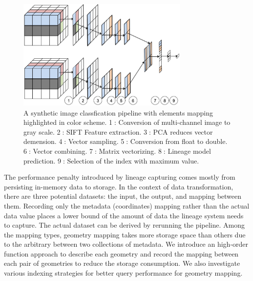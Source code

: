 \documentclass{sig-alternate}
\begin{document}
\begin{figure}[h]
\begin{center}
    \includegraphics[width=85mm]{pictures/Conceptual}
    \caption {A synthetic image classfication pipeline with elements mapping highlighted in color scheme. 
    \textcircled{1}: Conversion of multi-channel image to gray scale.
    \textcircled{2}: SIFT Feature extraction.
    \textcircled{3}: PCA reduces vector demension.
    \textcircled{4}: Vector sampling.
    \textcircled{5}: Conversion from float to double.
    \textcircled{6}: Vector combining.
    \textcircled{7}: Matrix vectorizing.
    \textcircled{8}: Lineage model prediction.
    \textcircled{9}: Selection of the index with maximum value.
    \label{fig:conceptual}
}
\end{center}
\end{figure}

The performance penalty introduced by lineage capturing comes mostly from persisting in-memory data to storage.
In the context of data transformation, there are three potential datasets: the input, the output, and mapping between them.
Recording only the metadata (coordinates) mapping rather than the actual data value places a lower bound of the amount
of data the lineage system needs to capture. The actual dataset can be derived by rerunning the pipeline.
Among the mapping types, geometry mapping takes more storage space than others due to the arbitrary between two collections
of metadata. We introduce an high-order function approach to describe each geometry and record the mapping between
each pair of geometries to reduce the storage consumption. We also investigate various indexing strategies for better
query performance for geometry mapping.
\end{document}
